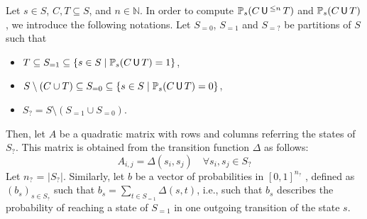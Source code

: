 Let $s \in S$, $C, T \subseteq S$, and $n \in \mathbb{N}$. In order to compute $\mathbb{P}_s(C \,\text{\sffamily U}\,^{\leq n} \, T)$ and $\mathbb{P}_s(C \,\text{\sffamily U}\, T)$, we introduce the following notations.
Let $S_{=0}$, $S_{=1}$ and $S_{=?}$ be partitions of $S$ such that
\begin{itemize}
  \item $T \subseteq S_{=1} \subseteq \{s \in S \; | \; \mathbb{P}_s(C \,\text{\sffamily U}\, T) = 1\}$,
  \item $S \setminus (C \cup T) \subseteq S_{=0} \subseteq \{ s \in S \; | \; \mathbb{P}_s(C \,\text{\sffamily U}\, T) = 0 \}$,
  \item $S_? = S \setminus (S_{=1} \cup S_{=0})$.
\end{itemize}
Then, let $A$ be a quadratic matrix with rows and columns referring the states of $S_?$. This matrix is obtained from the transition function $\Delta$ as follows:
\[
  A_{i, j} = \Delta(s_i, s_j) \quad \forall s_i, s_j \in S_?
\]
Let $n_?$ = $|S_?|$. Similarly, let $b$ be a vector of probabilities in $[0, 1]^{n_?}$ , defined as $(b_s)_{s \in S_?}$ such that $b_s = \sum_{t \in S_{=1}} \Delta(s, t)$, i.e., such that $b_s$ describes the probability of reaching a state of $S_{=1}$ in one outgoing transition of the state $s$.

